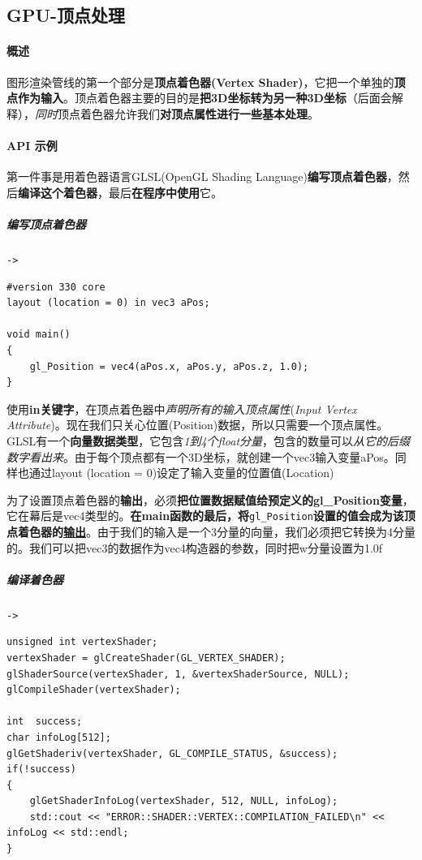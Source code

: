 \documentclass[UTF8,a4paper,12pt]{ctexbook}
\begin{document}
		\subsection{GPU-顶点处理}
			\paragraph{概述}		
				图形渲染管线的第一个部分是\textbf{顶点着色器(Vertex Shader)}，它把一个单独的\textbf{顶点作为输入}。顶点着色器主要的目的是\textbf{把3D坐标转为另一种3D坐标}（后面会解释），\textit{同时}顶点着色器允许我们\textbf{对顶点属性进行一些基本处理}。
			
			\paragraph{API 示例}
				第一件事是用着色器语言GLSL(OpenGL Shading Language)\textbf{编写顶点着色器}，然后\textbf{编译这个着色器}，最后\textbf{在程序中使用}它。
				
				\subparagraph{编写顶点着色器}\verb|->|
				
					\begin{lstlisting}
#version 330 core
layout (location = 0) in vec3 aPos;

void main()
{
    gl_Position = vec4(aPos.x, aPos.y, aPos.z, 1.0);
}				
					\end{lstlisting}
					
					使用\textbf{in关键字}，在顶点着色器中\textit{声明所有的输入顶点属性}(\textit{Input Vertex Attribute})。现在我们只关心位置(Position)数据，所以只需要一个顶点属性。GLSL有一个\textbf{向量数据类型}，它包含\textit{1到4个float分量}，包含的数量可以\textit{从它的后缀数字看出来}。由于每个顶点都有一个3D坐标，就创建一个vec3输入变量aPos。同样也通过layout (location = 0)设定了输入变量的位置值(Location)
					
					为了设置顶点着色器的\textbf{输出}，必须\textbf{把位置数据赋值给预定义的gl\_Position变量}，它在幕后是vec4类型的。\textbf{在main函数的最后，将}\verb|gl_Position|\textbf{设置的值会成为该顶点着色器的\underline{输出}}。由于我们的输入是一个3分量的向量，我们必须把它转换为4分量的。我们可以把vec3的数据作为vec4构造器的参数，同时把w分量设置为1.0f
				
				
				\subparagraph{编译着色器}\verb|->|
				
					\begin{lstlisting}
unsigned int vertexShader;
vertexShader = glCreateShader(GL_VERTEX_SHADER);
glShaderSource(vertexShader, 1, &vertexShaderSource, NULL);
glCompileShader(vertexShader);	

int  success;
char infoLog[512];
glGetShaderiv(vertexShader, GL_COMPILE_STATUS, &success);	
if(!success)
{
    glGetShaderInfoLog(vertexShader, 512, NULL, infoLog);
    std::cout << "ERROR::SHADER::VERTEX::COMPILATION_FAILED\n" << infoLog << std::endl;
}				
					\end{lstlisting}
				
\end{document}
